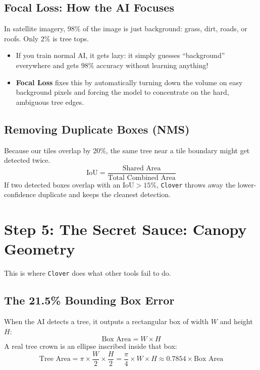 \documentclass[11pt,a4paper]{article}
\begin{document}
\subsection{Focal Loss: How the AI Focuses}
In satellite imagery, $98\%$ of the image is just background: grass, dirt, roads, or roofs. Only $2\%$ is tree tops. 
\begin{itemize}
    \item If you train normal AI, it gets lazy: it simply guesses ``background'' everywhere and gets $98\%$ accuracy without learning anything!
    \item \textbf{Focal Loss} fixes this by automatically turning down the volume on easy background pixels and forcing the model to concentrate on the hard, ambiguous tree edges.
\end{itemize}

\subsection{Removing Duplicate Boxes (NMS)}
Because our tiles overlap by 20\%, the same tree near a tile boundary might get detected twice.
\begin{equation}
\text{IoU} = \frac{\text{Shared Area}}{\text{Total Combined Area}}
\end{equation}
If two detected boxes overlap with an $\text{IoU} > 15\%$, \texttt{Clover} throws away the lower-confidence duplicate and keeps the cleanest detection.

\section{Step 5: The Secret Sauce: Canopy Geometry}

This is where \texttt{Clover} does what other tools fail to do.

\subsection{The 21.5\% Bounding Box Error}
When the AI detects a tree, it outputs a rectangular box of width $W$ and height $H$:
\begin{equation}
\text{Box Area} = W \times H
\end{equation}
A real tree crown is an ellipse inscribed inside that box:
\begin{equation}
\text{Tree Area} = \pi \times \frac{W}{2} \times \frac{H}{2} = \frac{\pi}{4} \times W \times H \approx 0.7854 \times \text{Box Area}
\end{equation}
\end{document}
